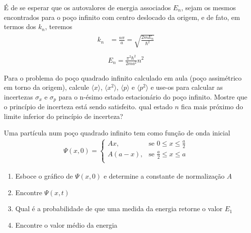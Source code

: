 \begin{prob}
\begin{sol}
		É de se esperar que os autovalores de energia associados $E_{n}$, sejam os mesmos encontrados para o poço infinito com centro deslocado da origem, e de fato, em termos dos $k_{n}$, teremos
		\begin{align}
				\begin{split}
					k_{n} &= \frac{n \pi}{a}=\sqrt{\frac{2mE_{n}}{\hbar^{2}}}\\
				\end{split}
		\end{align}
		\begin{align}
			\boxed{
				E_{n} = \frac{\pi^{2}\hbar^{2}}{2ma^{2}}n^{2}
			}
		\end{align}
	\end{sol}
\end{prob}
\begin{prob}
	Para o problema do poço quadrado infinito calculado em aula (poço assimétrico em torno da origem), calcule $\langle x \rangle$, $\langle x^{2} \rangle$, $\langle p \rangle$ e $\langle p^{2} \rangle$ e use-os para calcular as incertezas $\sigma_{x}$ e $\sigma_{p}$ para o n-ésimo estado estacionário do poço infinito. Mostre que o princípio de incerteza está sendo satisfeito. qual estado $n$ fica mais próximo do limite inferior do princípio de incerteza?
		\begin{sol}
				
		\end{sol}
\end{prob}
\begin{prob}
	Uma partícula num poço quadrado infinito tem como função de onda inicial
	\begin{eqnarray*}
			\Psi(x,0)=
			\begin{cases}
				Ax, &\text{se $0\leq x \leq \frac{a}{2}$}\\
				A \left(a-x\right), &\text{se $\frac{a}{2}\leq x\leq a$}\\
			\end{cases}
	\end{eqnarray*}
	\begin{enumerate}[label=\alph *)]
		\item Esboce o gráfico de $\Psi(x,0)$ e determine a constante de normalização $A$
		\item Encontre $\Psi(x,t)$
		\item Qual é a probabilidade de que uma medida da energia retorne o valor $E_{1}$
		\item Encontre o valor médio da energia
	\end{enumerate}
		\begin{sol}
				
		\end{sol}
\end{prob}
